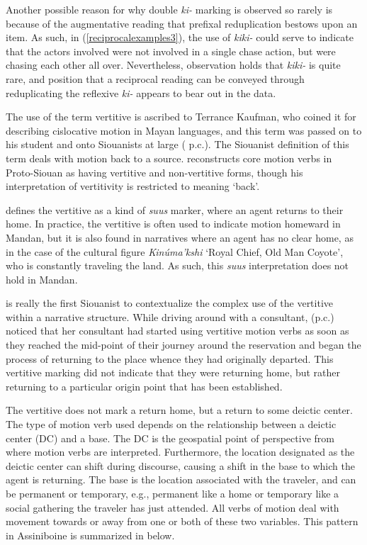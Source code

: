 Another possible reason for why double \textit{ki-} marking is observed so rarely is because of the augmentative reading that prefixal reduplication bestows upon an item. As such, in (\ref{reciprocalexamples3}), the use of \textit{kiki-} could serve to indicate that the actors involved were not involved in a single chase action, but were chasing each other all over. Nevertheless,  observation holds that \textit{kiki-} is quite rare, and  position that a reciprocal reading can be conveyed through reduplicating the reflexive \textit{ki-} appears to bear out in the data. 

The use of the term vertitive is ascribed to Terrance Kaufman, who coined it for describing cislocative motion in Mayan languages, and this term was passed on to his student \citeauthor{hollow1970} and onto Siouanists at large (\citeauthor{rankin2010} p.c.). The Siouanist definition of this term deals with motion back to a source. \citet{taylor1976} reconstructs core motion verbs in Proto-Siouan as having vertitive and non-vertitive forms, though his interpretation of vertitivity is restricted to meaning `back'.

\citet[238]{quintero2004} defines the vertitive as a kind of \textit{suus} marker, where an agent returns to their home. In practice, the vertitive is often used to indicate motion homeward in Mandan, but it is also found in narratives where an agent has no clear home, as in the case of the cultural figure \textit{Kinúma'kshi} `Royal Chief, Old Man Coyote', who is constantly traveling the land. As such, this \textit{suus} interpretation does not hold in Mandan.

\citet{cumberland2005} is really the first Siouanist to contextualize the complex use of the vertitive within a narrative structure. While driving around with a consultant, \citeauthor{cumberland2005} (p.c.) noticed that her consultant had started using vertitive motion verbs as soon as they reached the mid-point of their journey around the reservation and began the process of returning to the place whence they had originally departed. This vertitive marking did not indicate that they were returning home, but rather returning to a particular origin point that has been established.

The vertitive does not mark a return home, but a return to some deictic center. The type of motion verb used depends on the relationship between a deictic center (DC) and a base. The DC is the geospatial point of perspective from where motion verbs are interpreted. Furthermore, the location designated as the deictic center can shift during discourse, causing a shift in the base to which the agent is returning. The base is the location associated with the traveler, and can be permanent or temporary, e.g., permanent like a home or temporary like a social gathering the traveler has just attended. All verbs of motion deal with movement towards or away from one or both of these two variables. This pattern in Assiniboine is summarized in  below.

